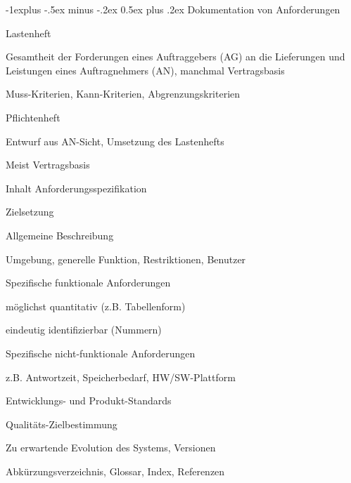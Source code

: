 \documentclass[a4paper]{article}
\makeatletter
\renewcommand{\subsection}{\@startsection{subsection}{2}{0mm}%
                                {-1explus -.5ex minus -.2ex}%
                                {0.5ex plus .2ex}%
                                {\normalfont\normalsize\bfseries}}
\makeatother
\begin{document}
\begin{multicols}{3}
  \subsection{Dokumentation von Anforderungen}
  \begin{itemize*}
    \item Lastenheft
          \begin{itemize*}
            \item Gesamtheit der Forderungen eines Auftraggebers (AG) an die Lieferungen und Leistungen eines Auftragnehmers (AN), manchmal Vertragsbasis
            \item Muss-Kriterien, Kann-Kriterien, Abgrenzungskriterien
          \end{itemize*}
    \item Pflichtenheft
          \begin{itemize*}
            \item Entwurf aus AN-Sicht, Umsetzung des Lastenhefts
            \item Meist Vertragsbasis
          \end{itemize*}
    \item Inhalt Anforderungsspezifikation
          \begin{itemize*}
            \item Zielsetzung
            \item Allgemeine Beschreibung
                  \begin{itemize*}
                    \item Umgebung, generelle Funktion, Restriktionen, Benutzer
                  \end{itemize*}
            \item Spezifische funktionale Anforderungen
                  \begin{itemize*}
                    \item möglichst quantitativ (z.B. Tabellenform)
                    \item eindeutig identifizierbar (Nummern)
                  \end{itemize*}
            \item Spezifische nicht-funktionale Anforderungen
                  \begin{itemize*}
                    \item z.B. Antwortzeit, Speicherbedarf, HW/SW-Plattform
                    \item Entwicklungs- und Produkt-Standards
                  \end{itemize*}
            \item Qualitäts-Zielbestimmung
            \item Zu erwartende Evolution des Systems, Versionen
            \item Abkürzungsverzeichnis, Glossar, Index, Referenzen
          \end{itemize*}
  \end{itemize*}



\end{multicols}
\end{document}
